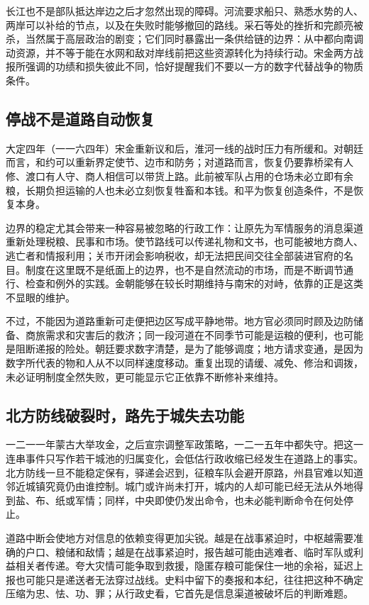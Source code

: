 长江也不是部队抵达岸边之后才忽然出现的障碍。河流要求船只、熟悉水势的人、两岸可以补给的节点，以及在失败时能够撤回的路线。采石等处的挫折和完颜亮被杀，当然属于高层政治的剧变；它们同时暴露出一条供给链的边界：从中都向南调动资源，并不等于能在水网和敌对岸线前把这些资源转化为持续行动。宋金两方战报所强调的功绩和损失彼此不同，恰好提醒我们不要以一方的数字代替战争的物质条件。

\subsection{停战不是道路自动恢复}

大定四年（一一六四年）宋金重新议和后，淮河一线的战时压力有所缓和。对朝廷而言，和约可以重新界定使节、边市和防务；对道路而言，恢复仍要靠桥梁有人修、渡口有人守、商人相信可以带货上路。此前被军队占用的仓场未必立即有余粮，长期负担运输的人也未必立刻恢复牲畜和本钱。和平为恢复创造条件，不是恢复本身。

边界的稳定尤其会带来一种容易被忽略的行政工作：让原先为军情服务的消息渠道重新处理税粮、民事和市场。使节路线可以传递礼物和文书，也可能被地方商人、逃亡者和情报利用；关市开闭会影响税收，却无法把民间交往全部装进官府的名目。制度在这里既不是纸面上的边界，也不是自然流动的市场，而是不断调节通行、检查和例外的实践。金朝能够在较长时期维持与南宋的对峙，依靠的正是这类不显眼的维护。

不过，不能因为道路重新可走便把边区写成平静地带。地方官必须同时顾及边防储备、商旅需求和灾害后的救济；同一段河道在不同季节可能是运粮的便利，也可能是阻断递报的险处。朝廷要求数字清楚，是为了能够调度；地方请求变通，是因为数字所代表的物和人从不以同样速度移动。重复出现的请缓、减免、修治和调拨，未必证明制度全然失败，更可能显示它正依靠不断修补来维持。

\subsection{北方防线破裂时，路先于城失去功能}

一二一一年蒙古大举攻金，之后宣宗调整军政策略，一二一五年中都失守。把这一连串事件只写作若干城池的归属变化，会低估行政收缩已经发生在道路上的事实。北方防线一旦不能稳定保有，驿递会迟到，征粮车队会避开原路，州县官难以知道邻近城镇究竟仍由谁控制。城门或许尚未打开，城内的人却可能已经无法从外地得到盐、布、纸或军情；同样，中央即使仍发出命令，也未必能判断命令在何处停止。

道路中断会使地方对信息的依赖变得更加尖锐。越是在战事紧迫时，中枢越需要准确的户口、粮储和敌情；越是在战事紧迫时，报告越可能由逃难者、临时军队或利益相关者传递。夸大灾情可能争取到救援，隐匿存粮可能保住一地的余裕，延迟上报也可能只是递送者无法穿过战线。史料中留下的奏报和本纪，往往把这种不确定压缩为忠、怯、功、罪；从行政史看，它首先是信息渠道被破坏后的判断难题。

